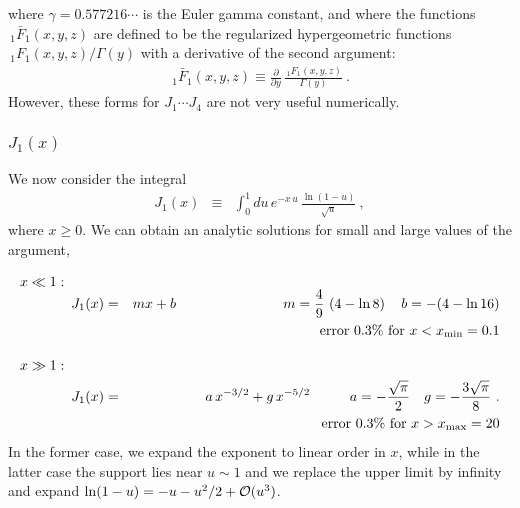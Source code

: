 \documentclass[preprint,12pt,eqsecnum,nofootinbib,amsmath,amssymb]{revtex4}
\begin{document}
where $\gamma = 0.577216 \cdots$ is the Euler gamma constant, 
and where the functions $\,_1\bar F_1(x,y,z)$ are defined to 
be the regularized hypergeometric functions $\,_1 F_1(x,y,z)/
\Gamma(y)$ with a derivative of the second argument:
\begin{eqnarray}
  \,_1\bar F_1(x,y,z) \equiv \frac{\partial}{\partial y}\,
  \frac{\,_1 F_1(x,y,z)}{\Gamma(y)} \ .
\end{eqnarray}
However, these forms for $J_1 \cdots J_4$ are not very
useful numerically. 


\subsubsection{$J_1(x)$}

We now consider the integral
\begin{eqnarray}
  J_1(x) &\equiv&
  \int_0^1 du\,e^{-x\, u} \, \frac{\ln(1-u)}
  {\sqrt{u}} \ ,
\end{eqnarray}
where $x \ge 0$. We can obtain an analytic solutions for small and large 
values of the argument,


\pagebreak
\begin{eqnarray}
\nonumber
  x \ll 1: \hskip1cm && 
\\[-5pt]
  J_1(x) &=& m x + b  
  \hskip2.7cm  
   m= \frac{4}{9}\,\left( 4 - \ln8 \right) 
  ~~~ b=-(4-\ln16)  
\\\nonumber &&
  \hskip-1.3cm {\rm error~} 0.3\% {\rm ~for~} x< x_{\rm min}=0.1
\\[10pt]
\nonumber
  x \gg 1: \hskip1cm &&
\\
  J_1(x) &=& a\, x^{-3/2} + g \, x^{-5/2}
  \hskip1cm  a=-\frac{\sqrt{\pi}}{2}
  ~~~   g=-\frac{3\sqrt{\pi}}{8} \ .
\\\nonumber &&
  \hskip-1.3cm {\rm error~} 0.3\% {\rm ~for~} x> x_{\rm max}=20
\end{eqnarray}
In the former case, we expand the exponent to linear order 
in $x$, while in the latter case the support lies near 
$u \sim 1$ and we replace the upper limit by infinity and 
expand $\ln(1-u)=-u - u^2/2 + {\cal O}(u^3)$. 
\end{document}
